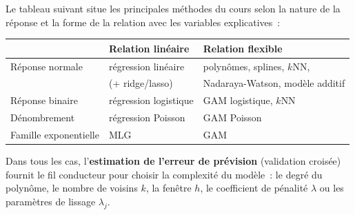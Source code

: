 \documentclass[11pt,letterpaper]{article}
\begin{document}
Le tableau suivant situe les principales méthodes du cours selon la nature de la réponse et la forme de la relation avec les variables explicatives~:

\begin{center}
\begin{tabular}{lll}
\toprule
 & \textbf{Relation linéaire} & \textbf{Relation flexible} \\
\midrule
Réponse normale & régression linéaire & polynômes, splines, $k$NN,\\
 & (+ ridge/lasso) & Nadaraya-Watson, modèle additif \\
Réponse binaire & régression logistique & GAM logistique, $k$NN \\
Dénombrement & régression Poisson & GAM Poisson \\
Famille exponentielle & MLG & GAM \\
\bottomrule
\end{tabular}
\end{center}

Dans tous les cas, l'\textbf{estimation de l'erreur de prévision} (validation croisée) fournit le fil conducteur pour choisir la complexité du modèle~: le degré du polynôme, le nombre de voisins $k$, la fenêtre $h$, le coefficient de pénalité $\lambda$ ou les paramètres de lissage $\lambda_j$.
\end{document}
